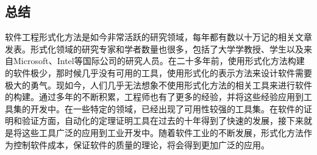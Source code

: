 \documentclass{article}
\begin{document}
\begin{CJK}{UTF8}{gbsn}
\begin{spacing}{1.4}
\section{总结}
软件工程形式化方法是如今非常活跃的研究领域，每年都有数以十万记的相关文章发表。形式化领域的研究专家和学者数量也很多，包括了大学学教授、学生以及来自Microsoft、Intel等国际公司的研究人员。在二十多年前，使用形式化方法构建的软件极少，那时候几乎没有可用的工具，使用形式化的表示方法来设计软件需要极大的勇气。现如今，人们几乎无法想象不使用形式化方法的相关工具来进行软件的构建。通过多年的不断积累，工程师也有了更多的经验，并将这些经验应用到工具集的开发中。在一些特定的领域，已经出现了可用性较强的工具集。在软件的证明和验证方面，自动化的定理证明工具在过去的十年得到了快速的发展，接下来就是将这些工具广泛的应用到工业开发中。随着软件工业的不断发展，形式化方法作为控制软件成本，保证软件的质量的理论，将会得到更加广泛的应用。



\end{spacing}
\end{CJK}
\end{document}
